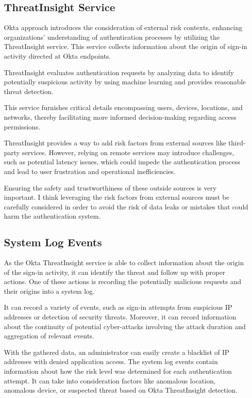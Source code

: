 \subsection*{ThreatInsight Service}
Okta approach introduces the consideration of external risk contexts, enhancing organizations' understanding of authentication processes by utilizing the ThreatInsight service.
This service collects information about the origin of sign-in activity directed at Okta endpoints.

ThreatInsight evaluates authentication requests by analyzing data to identify potentially suspicious activity by using machine learning and provides reasonable threat detection. 

This service furnishes critical details encompassing users, devices, locations, and networks, thereby facilitating more informed decision-making regarding access permissions.

ThreatInsight provides a way to add risk factors from external sources like third-party services. However, relying on remote services may introduce challenges, such as potential latency issues, which could impede the authentication process and lead to user frustration and operational inefficiencies.\cite{existing-okta-lowrisk} \cite{existing-okta-confidence}

Ensuring the safety and trustworthiness of these outside sources is very important.
I think leveraging the risk factors from external sources must be carefully considered in order to avoid the risk of data leaks or mistakes that could harm the authentication system.

\newpage

\subsection*{System Log Events}
As the Okta ThreatInsight service is able to collect information about the origin of the sign-in activity, it can identify the threat and follow up with proper actions.
One of these actions is recording the potentially malicious requests and their origins into a system log.

It can record a variety of events, such as sign-in attempts from suspicious IP addresses or detection of security threats.
Moreover, it can record information about the continuity of potential cyber-attacks involving the attack duration and aggregation of relevant events.

With the gathered data, an administrator can easily create a blacklist of IP addresses with denied application access.
The system log events contain information about how the risk level was determined for each authentication attempt.
It can take into consideration factors like anomalous location, anomalous device, or suspected threat based on Okta ThreatInsight detection.\cite{existing-okta-risk-scoring}\cite{existing-okta-syslog}

